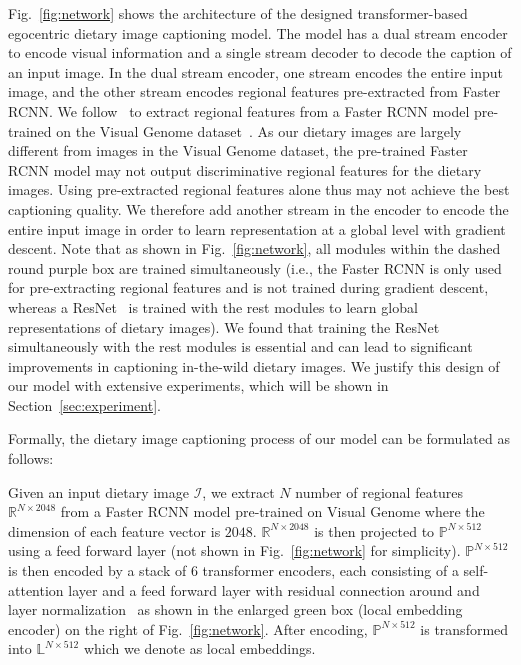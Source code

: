 \documentclass[journal]{IEEEtran}
\begin{document}
Fig.~\ref{fig:network} shows the architecture of the designed transformer-based egocentric dietary image captioning model. The model has a dual stream encoder to encode visual information and a single stream decoder to decode the caption of an input image. In the dual stream encoder, one stream encodes the entire input image, and the other stream encodes regional features pre-extracted from Faster RCNN. We follow~\cite{anderson2018bottom} to extract regional features from a Faster RCNN model pre-trained on the Visual Genome dataset~\cite{krishna2017visual}. As our dietary images are largely different from images in the Visual Genome dataset,  the pre-trained Faster RCNN model may not output discriminative regional features for the dietary images. Using pre-extracted regional features alone thus may not achieve the best captioning quality. We therefore add another stream in the encoder to encode the entire input image in order to learn representation at a global level with gradient descent. Note that as shown in Fig.~\ref{fig:network}, all modules within the dashed round purple box are trained simultaneously (i.e., the Faster RCNN is only used for pre-extracting regional features and is not trained during gradient descent, whereas a ResNet~\cite{he2016deep} is trained with the rest modules to learn global representations of dietary images). We found that training the ResNet simultaneously with the rest modules is essential and can lead to significant improvements in captioning in-the-wild dietary images. We justify this design of our model with extensive experiments, which will be shown in Section~\ref{sec:experiment}. 

Formally, the dietary image captioning process of our model can be formulated as follows: 

Given an input dietary image $\mathcal{I}$, we extract $N$ number of regional features $\mathbb{R}^{N \times 2048}$ from a Faster RCNN model pre-trained on Visual Genome where the dimension of each feature vector is $2048$. $\mathbb{R}^{N \times 2048}$ is then projected to $\mathbb{P}^{N \times 512}$ using a feed forward layer (not shown in Fig.~\ref{fig:network} for simplicity). $\mathbb{P}^{N \times 512}$ is then encoded by a stack of 6 transformer encoders, each consisting of a self-attention layer and a feed forward layer with residual connection around and layer normalization~\cite{ba2016layer} as shown in the enlarged green box (local embedding encoder) on the right of Fig.~\ref{fig:network}. After encoding, $\mathbb{P}^{N \times 512}$ is transformed into $\mathbb{L}^{N \times 512}$ which we denote as local embeddings.
\end{document}
